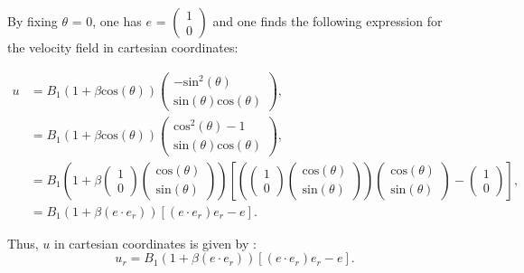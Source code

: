 \documentclass{article}
\begin{document}
   By fixing $\theta$ = 0, one has $e$ = $\begin{pmatrix}
   1 \\
   0 \end{pmatrix}$ and one finds the following expression for the velocity field 
   in cartesian coordinates: 

\begin{align*}
u &= B_1 \left(1+\beta \mathrm{cos}(\theta) \right) \begin{pmatrix}
   -\mathrm{sin}^2(\theta) \\
   \mathrm{sin}(\theta)\mathrm{cos}(\theta)
\end{pmatrix},  \\
&= B_1 \left(1+\beta \mathrm{cos}(\theta) \right) \begin{pmatrix}
   \mathrm{cos}^2(\theta)-1 \\
   \mathrm{sin}(\theta)\mathrm{cos}(\theta)
\end{pmatrix}, \\
&= B_1 \left(1+\beta \begin{pmatrix}
   1 \\
   0 \end{pmatrix}\begin{pmatrix}
   \mathrm{cos}(\theta) \\
   \mathrm{sin}(\theta)
\end{pmatrix}\right) \left[ \left( \begin{pmatrix}
   1 \\
   0 \end{pmatrix}\begin{pmatrix}
   \mathrm{cos}(\theta) \\
   \mathrm{sin}(\theta)
\end{pmatrix}\right) \begin{pmatrix}
   \mathrm{cos}(\theta) \\
   \mathrm{sin}(\theta)
\end{pmatrix} - \begin{pmatrix}
   1 \\
   0 \end{pmatrix}\right], \\
&= B_1(1+\beta (e \cdot e_r)) [(e \cdot e_r)e_r - e]. 
\end{align*}

\vspace{0.5 cm}
Thus, $u$ in cartesian coordinates is given by :
\begin{equation*}
\boxed{u_r = B_1(1+\beta (e\cdot e_r)) [(e\cdot e_r)e_r - e].}
\end{equation*}
\end{document}
